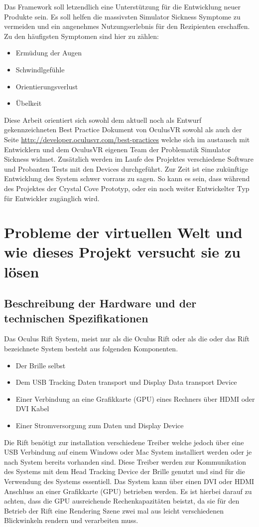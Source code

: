 \documentclass[pagesize, paper=a4, fontsize=12pt,titlepage=true, headings=small, headnosepline, abstractoff, liststotoc, nochapterprefix, plainheadsepline]{scrreprt}
\begin{document}
Das Framework soll letzendlich eine Unterstützung für die Entwicklung neuer Produkte sein. Es soll helfen die massivsten Simulator Sickness Symptome zu vermeiden und ein angenehmes Nutzungserlebnis für den Rezipienten erschaffen. Zu den häufigsten Symptomen sind hier zu zählen:
\begin{itemize}
\item Ermüdung der Augen
\item Schwindlgefühle
\item Orientierungsverlust
\item Übelkeit
\end{itemize}

Diese Arbeit orientiert sich sowohl dem aktuell noch als Entwurf gekennzeichneten Best Practice Dokument von OculusVR sowohl als auch der Seite \url{http://developer.oculusvr.com/best-practices} welche sich im austausch mit Entwicklern und dem OculusVR eigenen Team der Problematik Simulator Sickness widmet. Zusätzlich werden im Laufe des Projektes verschiedene Software und Probanten Tests mit den Devices durchgeführt. Zur Zeit ist eine zukünftige Entwicklung des System schwer vorraus zu sagen. So kann es sein, dass während des Projektes der Crystal Cove Prototyp, oder ein noch weiter Entwickelter Typ für Entwickler zugänglich wird.




\chapter{Probleme der virtuellen Welt und wie dieses Projekt versucht sie zu lösen}
\section{Beschreibung der Hardware und der technischen Spezifikationen}
Das Oculus Rift System, meist nur als die Oculus Rift oder als die oder das Rift bezeichnete System besteht aus folgenden Komponenten.
\begin{itemize}
\item Der Brille selbst
\item Dem USB Tracking Daten transport und Display Data transport Device
\item Einer Verbindung an eine Grafikkarte (GPU) eines Rechners über HDMI oder DVI Kabel
\item Einer Stromversorgung zum Daten und Display Device
\end{itemize}
Die Rift benötigt zur installation verschiedene Treiber welche jedoch über eine USB Verbindung auf einem Windows oder Mac System installiert werden oder je nach System bereits vorhanden sind. Diese Treiber werden zur Kommunikation des Systems mit dem Head Tracking Device der Brille genutzt und sind für die Verwendung des Systems essentiell. Das System kann über einen DVI oder HDMI Anschluss an einer Grafikkarte (GPU) betrieben werden. Es ist hierbei darauf zu achten, dass die GPU ausreichende Rechenkapazitäten beistzt, da sie für den Betrieb der Rift eine Rendering Szene zwei mal aus leicht verschiedenen Blickwinkeln rendern und verarbeiten muss.
\end{document}
